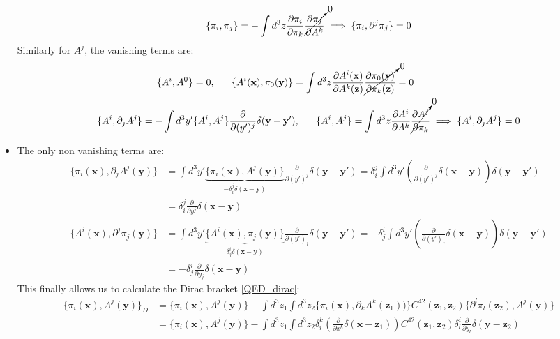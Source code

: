 \documentclass[11pt]{article}
\numberwithin{equation}{section}
\begin{document}
\begin{itemize}
\begin{align*}
     \{\pi_i,\pi_j\} = -\int d^3z\frac{\partial \pi_i}{\partial\pi_k}\cancelto{0}{\frac{\partial\pi_j}{\partial A^k}}\implies  \{\pi_i,\partial^j\pi_j \} = 0 
  \end{align*}
  Similarly for $A^j$, the vanishing terms are:
\begin{align*}
    \{A^i,A^0\} &= 0, ~~~~~
    \{A^i(\textbf{x}),\pi_0(\textbf{y})\} = \int d^3z \frac{\partial A^i(\textbf{x})}{\partial A^k(\textbf{z})}\cancelto{0}{\frac{\partial \pi_0(\textbf{y})}{\partial \pi_k(\textbf{z})}} =0 \\
    \{A^i,\partial_jA^j \}  = -\int d^3y'&\{A^i,A^j\}\frac{\partial}{\partial(y')^j}\delta(\textbf{y}-\textbf{y}'),~~~~~ 
     \{A^i,A^j\} = \int d^3z\frac{\partial A^i}{\partial A^k}\cancelto{0}{\frac{\partial A^j}{\partial \pi_k}}\implies  \{A^i,\partial_jA^j \} = 0
  \end{align*}
  \item The only non vanishing terms are:
  \begin{align*}
    \{\pi_i(\textbf{x}),\partial_jA^j(\textbf{y})\} &= \int d^3y'\underbrace{\{\pi_i(\textbf{x}),A^j(\textbf{y})\}}_{-\delta^{j}_i\delta(\textbf{x}-\textbf{y})}\frac{\partial}{\partial(y')^j}\delta(\textbf{y}-\textbf{y}') =  \delta^j_i \int d^3y'\left(\frac{\partial}{\partial(y')^j}\delta(\textbf{x}-\textbf{y})\right)\delta(\textbf{y}-\textbf{y}')   \\
   & = \delta^j_i\frac{\partial}{\partial y^j}\delta(\textbf{x}-\textbf{y}) \\
     \{A^i(\textbf{x}),\partial^j\pi_j(\textbf{y})\} &= \int d^3y'\underbrace{\{A^i(\textbf{x}),\pi_j(\textbf{y})\}}_{\delta^{i}_j\delta(\textbf{x}-\textbf{y})}\frac{\partial}{\partial(y')_j}\delta(\textbf{y}-\textbf{y}') =  -\delta^i_j \int d^3y'\left(\frac{\partial}{\partial(y')_j}\delta(\textbf{x}-\textbf{y})\right)\delta(\textbf{y}-\textbf{y}') \\ 
    &  = -\delta^i_j\frac{\partial}{\partial y_j}\delta(\textbf{x}-\textbf{y})
  \end{align*}
  This finally allows us to calculate the Dirac bracket \ref{QED_dirac}:
  \begin{align*}
    \{\pi_i(\textbf{x}),A^j(\textbf{y})\}_D  &= \{\pi_i(\textbf{x}),A^j(\textbf{y})\}-\int d^3z_1\int d^3z_2\{\pi_i(\textbf{x}),\partial_kA^k(\textbf{z}_1))\}C^{42}(\textbf{z}_1,\textbf{z}_2)\{\partial^l\pi_l(\textbf{z}_2),A^j(\textbf{y})\} \\
    & = \{\pi_i(\textbf{x}),A^j(\textbf{y})\}-\int d^3z_1\int d^3z_2\delta^k_i\left(\frac{\partial}{\partial x^k}\delta(\textbf{x}-\textbf{z}_1)\right)C^{42}(\textbf{z}_1,\textbf{z}_2)\delta^i_l\frac{\partial}{\partial y_l}\delta(\textbf{y}-\textbf{z}_2) \\

\end{align*}
\end{itemize}
\end{document}
